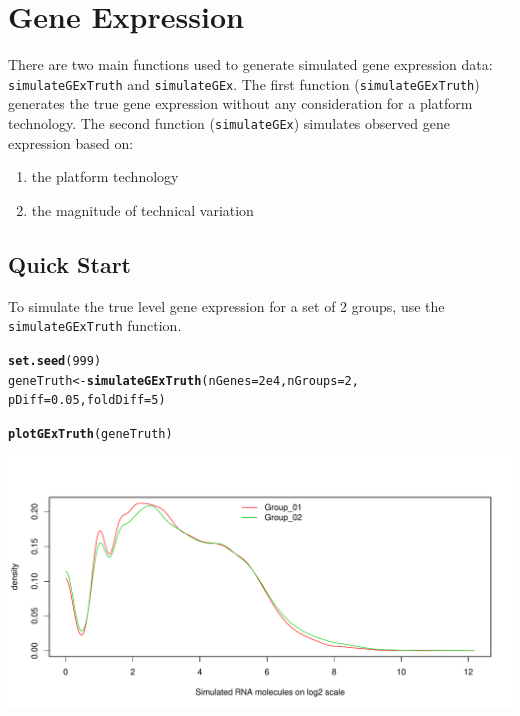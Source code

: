 \documentclass{article}\usepackage[]{graphicx}\usepackage[usenames,dvipsnames]{color}
\makeatletter
\def\maxwidth{ %
  \ifdim\Gin@nat@width>\linewidth
    \linewidth
  \else
    \Gin@nat@width
  \fi
}
\newcommand{\hlnum}[1]{\textcolor[rgb]{0.686,0.059,0.569}{#1}}%
\newcommand{\hlstd}[1]{\textcolor[rgb]{0.345,0.345,0.345}{#1}}%
\newcommand{\hlkwb}[1]{\textcolor[rgb]{0.69,0.353,0.396}{#1}}%
\newcommand{\hlkwc}[1]{\textcolor[rgb]{0.333,0.667,0.333}{#1}}%
\newcommand{\hlkwd}[1]{\textcolor[rgb]{0.737,0.353,0.396}{\textbf{#1}}}%
\newenvironment{kframe}{%
 \def\at@end@of@kframe{}%
 \ifinner\ifhmode%
  \def\at@end@of@kframe{\end{minipage}}%
  \begin{minipage}{\columnwidth}%
 \fi\fi%
 \def\FrameCommand##1{\hskip\@totalleftmargin \hskip-\fboxsep
 \colorbox{shadecolor}{##1}\hskip-\fboxsep
     \hskip-\linewidth \hskip-\@totalleftmargin \hskip\columnwidth}%
 \MakeFramed {\advance\hsize-\width
   \@totalleftmargin\z@ \linewidth\hsize
   \@setminipage}}%
 {\par\unskip\endMakeFramed%
 \at@end@of@kframe}
\newenvironment{knitrout}{}{} %
\makeatother
\begin{document}
\section{Gene Expression}
There are two main functions used to generate simulated gene expression data: 
\texttt{simulateGExTruth} and \texttt{simulateGEx}. The first function 
(\texttt{simulateGExTruth}) generates the true gene expression without any 
consideration for a platform technology. The second function 
(\texttt{simulateGEx}) simulates observed gene expression based on: 

\begin{enumerate}
\item the platform technology 
\item the magnitude of technical variation
\end{enumerate}


\subsection{Quick Start}
To simulate the true level gene expression for a set of 2 groups, use the 
\texttt{simulateGExTruth} function. 
\begin{knitrout}
\color{fgcolor}\begin{kframe}
\begin{alltt}
\hlkwd{set.seed}\hlstd{(}\hlnum{999}\hlstd{)}
\hlstd{geneTruth} \hlkwb{<-} \hlkwd{simulateGExTruth}\hlstd{(}\hlkwc{nGenes} \hlstd{=} \hlnum{2e4}\hlstd{,} \hlkwc{nGroups} \hlstd{=} \hlnum{2}\hlstd{,}
                              \hlkwc{pDiff} \hlstd{=} \hlnum{0.05}\hlstd{,} \hlkwc{foldDiff} \hlstd{=} \hlnum{5}\hlstd{)}
\end{alltt}


{\ttfamily\noindent\itshape\color{messagecolor}{\#\# [quantroSim]: Simulating RNA transcript counts using a Poisson \\\#\#\ \ \ \ \ \ \ \ \ \  distribution with mean parameters from 0.01 to 4662.66}}\begin{alltt}
\hlkwd{plotGExTruth}\hlstd{(geneTruth)}
\end{alltt}
\end{kframe}
\includegraphics[width=\maxwidth]{figure/geneTruth-Fig-1} 

\end{knitrout}
\end{document}
